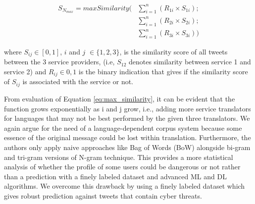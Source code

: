 \begin{equation}
\begin{aligned}
    S_{N_{max}} = maxSimilarity(&\sum_{i=1}^{n} (R_{1i} \times S_{1i}); \\
    &\sum_{i=1}^{n} (R_{2i} \times S_{2i}); \\
    &\sum_{i=1}^{n} (R_{3i} \times S_{3i}))
\end{aligned}
\label{eq:max_similarity}
\end{equation}

where $S_{ij} \in [0,1]$, $i$ and $j$ $\in \{1,2,3\}$, is the similarity score of all tweets between the 3 service providers, (i.e, $S_{12}$ denotes similarity between service 1 and service 2) and $ R_{ij} \in {0,1}$ is the binary indication that gives if the similarity score of $S_{ij}$ is associated with the service or not. 


From evaluation of Equation \ref{eq:max_similarity}, it can be evident that the function grows exponentially as i and j grow, i.e., adding more service translators for languages that may not be best performed by the given three translators. We again argue for the need of a language-dependent corpus system because some essence of the original message could be lost within translation. Furthermore, the authors only apply naive approaches like Bag of Words (BoW) alongside bi-gram and tri-gram versions of N-gram technique. This provides a more statistical analysis of whether the profile of some users could be dangerous or not rather than a prediction with a finely labeled dataset and advanced ML and DL algorithms. We overcome this drawback by using a finely labeled dataset which gives robust prediction against tweets that contain cyber threats.


